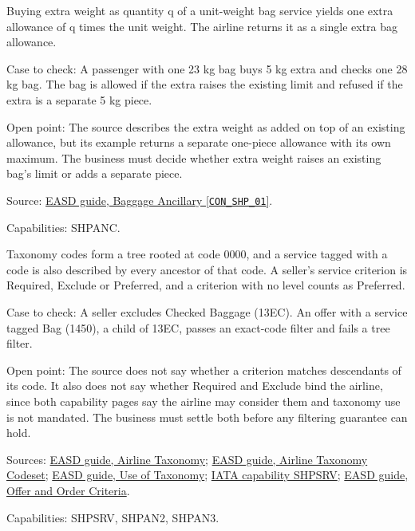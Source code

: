 \begin{definition}
  \label{def:ancillaries-extra-baggage-weight}
  \notready
  Buying extra weight as quantity q of a unit-weight bag service yields one
  extra allowance of q times the unit weight. The airline returns it as a
  single extra bag allowance.

  Case to check: A passenger with one 23 kg bag buys 5 kg extra and checks
  one 28 kg bag. The bag is allowed if the extra raises the existing limit
  and refused if the extra is a separate 5 kg piece.

  Open point: The source describes the extra weight as added on top of an
  existing allowance, but its example returns a separate one-piece allowance
  with its own maximum. The business must decide whether extra weight raises
  an existing bag's limit or adds a separate piece.

  Source: \href{https://standards.atlassian.net/wiki/spaces/EASD/pages/574423130}{EASD guide, Baggage Ancillary [\texttt{CON\_SHP\_01}]}.

  Capabilities: SHPANC.
\end{definition}

\begin{definition}
  \label{def:ancillaries-taxonomy-criteria}
  \notready
  Taxonomy codes form a tree rooted at code 0000, and a service tagged with
  a code is also described by every ancestor of that code. A seller's
  service criterion is Required, Exclude or Preferred, and a criterion with
  no level counts as Preferred.

  Case to check: A seller excludes Checked Baggage (13EC). An offer with a
  service tagged Bag (1450), a child of 13EC, passes an exact-code filter
  and fails a tree filter.

  Open point: The source does not say whether a criterion matches
  descendants of its code. It also does not say whether Required and Exclude
  bind the airline, since both capability pages say the airline may consider
  them and taxonomy use is not mandated. The business must settle both
  before any filtering guarantee can hold.

  Sources: \href{https://standards.atlassian.net/wiki/spaces/EASD/pages/574652545}{EASD guide, Airline Taxonomy};
  \href{https://standards.atlassian.net/wiki/spaces/EASD/pages/574652513}{EASD guide, Airline Taxonomy Codeset};
  \href{https://standards.atlassian.net/wiki/spaces/EASD/pages/574816319}{EASD guide, Use of Taxonomy};
  \href{https://retailing.iata.org/armi/docs/SHPSRV/}{IATA capability SHPSRV};
  \href{https://standards.atlassian.net/wiki/spaces/EASD/pages/574914671}{EASD guide, Offer and Order Criteria}.

  Capabilities: SHPSRV, SHPAN2, SHPAN3.
\end{definition}

